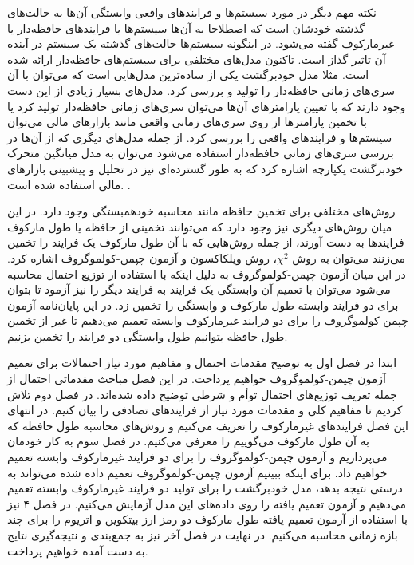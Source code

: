 نکته مهم دیگر در مورد سیستم‌ها و فرایندهای واقعی وابستگی آن‌ها به حالت‌های گذشته 
خودشان است که اصطلاحا به آن‌ها سیستم‌ها یا فرایندهای حافظه‌دار یا غیرمارکوف گفته می‌شود. در اینگونه سیستم‌ها حالت‌های گذشته یک سیستم در آینده آن 
تاثیر گذاز است. تاکنون مدل‌های مختلفی برای سیستم‌های حافظه‌دار ارائه شده است. مثلا مدل خودبرگشت 
یکی از ساده‌ترین مدل‌هایی است که می‌توان با آن سری‌های زمانی حافظه‌دار را تولید و بررسی کرد.\cite{shumway2011time, GANDHI20157}
مدل‌‌های بسیار زیادی از این دست وجود دارند که با تعیین پارامترهای آن‌ها می‌توان سری‌های زمانی حافظه‌دار تولید کرد یا با تخمین پارامترها 
از روی سری‌های زمانی واقعی مانند بازارهای مالی می‌توان سیستم‌ها و فرایندهای واقعی را بررسی کرد.\cite{shumway2011time} 
از جمله مدل‌های دیگری که از‌ آن‌ها در بررسی سری‌های زمانی حافظه‌دار استفاده می‌شود می‌توان به مدل 
میانگین متحرک خودبرگشت یکپارچه اشاره کرد که به طور گسترده‌ای نیز در تحلیل و پیشبینی بازارهای مالی استفاده شده است.
\cite{mills_time_1990, asteriou_applied_2011, box_time_2016}.

روش‌های مختلفی برای تخمین حافظه مانند محاسبه خودهمبستگی وجود دارد.\cite{stroe-kunold_estimating_2009} 
در این میان روش‌های دیگری نیز وجود دارد که می‌توانند تخمینی از حافظه یا طول مارکوف فرایندها به دست 
آورند، از جمله
روش‌هایی که با آن طول مارکوف 
یک فرایند را تخمین می‌زنند می‌توان به روش  $\chi^2$\cite{ghasemi_markov_2007}، 
روش ویلکاکسون\cite{waechter_stochastic_2004} و 
آزمون چپمن-کولموگروف\cite{fazeli_probing_2008,risken_fokker-planck_1984,friedrich_approaching_2011,friedrich_description_1997} اشاره کرد.
در این میان آزمون چپمن-کولموگروف به دلیل اینکه با استفاده از توزیع احتمال محاسبه می‌شود می‌توان با تعمیم آن وابستگی یک فرایند 
به فرایند دیگر را نیز آزمود تا بتوان برای دو فرایند وابسته طول مارکوف و وابستگی را  تخمین زد. در این پایان‌نامه 
آزمون چپمن-کولموگروف را برای دو فرایند غیرمارکوف وابسته تعمیم می‌دهیم تا غیر از تخمین طول حافظه بتوانیم طول وابستگی 
دو فرایند را تخمین بزنیم.

ابتدا در فصل اول به توضیح مقدمات احتمال و مفاهیم مورد نیاز احتمالات برای تعمیم آزمون چپمن-کولموگروف خواهیم پرداخت. 
در این فصل مباحث مقدماتی احتمال از جمله تعریف توزیع‌های احتمال توأم و شرطی توضیح داده شده‌اند. 
در فصل دوم تلاش کردیم تا مفاهیم کلی و مقدمات مورد نیاز از فرایندهای تصادفی را بیان کنیم. در انتهای این فصل 
فرایندهای غیرمارکوف را تعریف می‌کنیم و روش‌های محاسبه طول حافظه که به آن طول مارکوف می‌گوییم را 
معرفی می‌کنیم. در فصل سوم به کار خودمان می‌پردازیم و آزمون چپمن-کولموگروف را 
برای دو فرایند غیرمارکوف وابسته تعمیم خواهیم داد. برای اینکه ببینیم آزمون چپمن-کولموگروف تعمیم داده شده 
می‌تواند به درستی نتیجه بدهد، مدل خودبرگشت را برای تولید دو فرایند غیرمارکوف وابسته تعمیم می‌دهیم و آزمون تعمیم 
یافته را روی داده‌های این مدل آزمایش می‌کنیم. در فصل ۴ نیز با استفاده از آزمون تعمیم یافته طول مارکوف دو رمز ارز 
بیتکوین و اتریوم را برای چند بازه زمانی محاسبه می‌کنیم. در نهایت در فصل آخر نیز به جمع‌بندی و نتیجه‌گیری نتایج به دست آمده خواهیم پرداخت.




